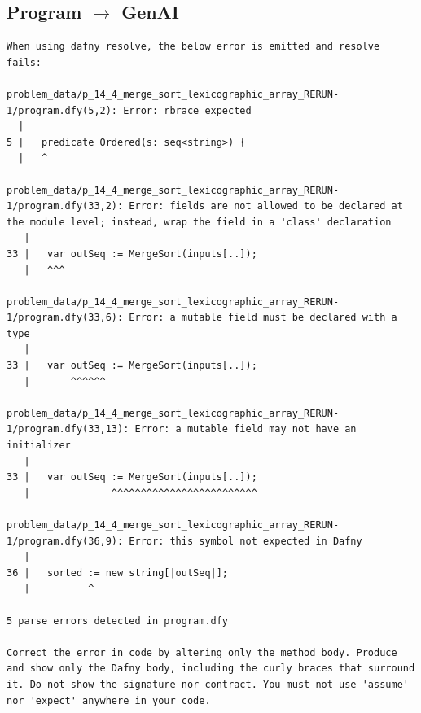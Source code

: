 \documentclass{article}
\begin{document}
\subsection*{Program $\rightarrow$ GenAI}
\begin{lstlisting}
When using dafny resolve, the below error is emitted and resolve fails:

problem_data/p_14_4_merge_sort_lexicographic_array_RERUN-1/program.dfy(5,2): Error: rbrace expected
  |
5 |   predicate Ordered(s: seq<string>) {
  |   ^

problem_data/p_14_4_merge_sort_lexicographic_array_RERUN-1/program.dfy(33,2): Error: fields are not allowed to be declared at the module level; instead, wrap the field in a 'class' declaration
   |
33 |   var outSeq := MergeSort(inputs[..]);
   |   ^^^

problem_data/p_14_4_merge_sort_lexicographic_array_RERUN-1/program.dfy(33,6): Error: a mutable field must be declared with a type
   |
33 |   var outSeq := MergeSort(inputs[..]);
   |       ^^^^^^

problem_data/p_14_4_merge_sort_lexicographic_array_RERUN-1/program.dfy(33,13): Error: a mutable field may not have an initializer
   |
33 |   var outSeq := MergeSort(inputs[..]);
   |              ^^^^^^^^^^^^^^^^^^^^^^^^^

problem_data/p_14_4_merge_sort_lexicographic_array_RERUN-1/program.dfy(36,9): Error: this symbol not expected in Dafny
   |
36 |   sorted := new string[|outSeq|];
   |          ^

5 parse errors detected in program.dfy

Correct the error in code by altering only the method body. Produce and show only the Dafny body, including the curly braces that surround it. Do not show the signature nor contract. You must not use 'assume' nor 'expect' anywhere in your code.
\end{lstlisting}
\end{document}
